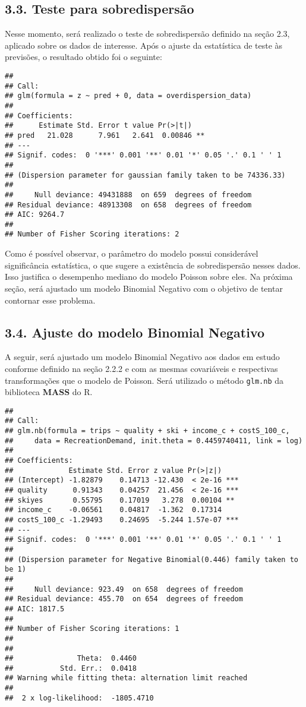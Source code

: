 \documentclass[
]{article}
\begin{document}
\subsection{3.3. Teste para
sobredispersão}\label{teste-para-sobredispersuxe3o}

Nesse momento, será realizado o teste de sobredispersão definido na
seção 2.3, aplicado sobre os dados de interesse. Após o ajuste da
estatística de teste às previsões, o resultado obtido foi o seguinte:

\begin{verbatim}
## 
## Call:
## glm(formula = z ~ pred + 0, data = overdispersion_data)
## 
## Coefficients:
##      Estimate Std. Error t value Pr(>|t|)   
## pred   21.028      7.961   2.641  0.00846 **
## ---
## Signif. codes:  0 '***' 0.001 '**' 0.01 '*' 0.05 '.' 0.1 ' ' 1
## 
## (Dispersion parameter for gaussian family taken to be 74336.33)
## 
##     Null deviance: 49431888  on 659  degrees of freedom
## Residual deviance: 48913308  on 658  degrees of freedom
## AIC: 9264.7
## 
## Number of Fisher Scoring iterations: 2
\end{verbatim}

Como é possível observar, o parâmetro do modelo possui considerável
significância estatística, o que sugere a existência de sobredispersão
nesses dados. Isso justifica o desempenho mediano do modelo Poisson
sobre eles. Na próxima seção, será ajustado um modelo Binomial Negativo
com o objetivo de tentar contornar esse problema.

\subsection{3.4. Ajuste do modelo Binomial
Negativo}\label{ajuste-do-modelo-binomial-negativo}

A seguir, será ajustado um modelo Binomial Negativo aos dados em estudo
conforme definido na seção 2.2.2 e com as mesmas covariáveis e
respectivas transformações que o modelo de Poisson. Será utilizado o
método \texttt{glm.nb} da biblioteca \textbf{MASS} do R.

\begin{verbatim}
## 
## Call:
## glm.nb(formula = trips ~ quality + ski + income_c + costS_100_c, 
##     data = RecreationDemand, init.theta = 0.4459740411, link = log)
## 
## Coefficients:
##             Estimate Std. Error z value Pr(>|z|)    
## (Intercept) -1.82879    0.14713 -12.430  < 2e-16 ***
## quality      0.91343    0.04257  21.456  < 2e-16 ***
## skiyes       0.55795    0.17019   3.278  0.00104 ** 
## income_c    -0.06561    0.04817  -1.362  0.17314    
## costS_100_c -1.29493    0.24695  -5.244 1.57e-07 ***
## ---
## Signif. codes:  0 '***' 0.001 '**' 0.01 '*' 0.05 '.' 0.1 ' ' 1
## 
## (Dispersion parameter for Negative Binomial(0.446) family taken to be 1)
## 
##     Null deviance: 923.49  on 658  degrees of freedom
## Residual deviance: 455.70  on 654  degrees of freedom
## AIC: 1817.5
## 
## Number of Fisher Scoring iterations: 1
## 
## 
##               Theta:  0.4460 
##           Std. Err.:  0.0418 
## Warning while fitting theta: alternation limit reached 
## 
##  2 x log-likelihood:  -1805.4710
\end{verbatim}
\end{document}
